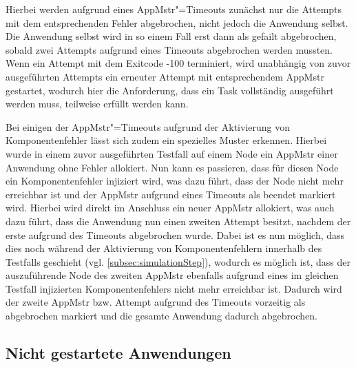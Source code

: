 Hierbei werden aufgrund eines \ac{AppMstr}"=Timeouts zunächst nur die Attempts mit dem entsprechenden Fehler abgebrochen, nicht jedoch die Anwendung selbst.
Die Anwendung selbst wird in so einem Fall erst dann als gefailt abgebrochen, sobald zwei Attempts aufgrund eines Timeouts abgebrochen werden mussten.
Wenn ein Attempt mit dem Exitcode -100 terminiert, wird unabhängig von zuvor ausgeführten Attempts ein erneuter Attempt mit entsprechendem \ac{AppMstr} gestartet, wodurch hier die Anforderung, dass ein Task vollständig ausgeführt werden muss, teilweise erfüllt werden kann.

Bei einigen der \ac{AppMstr}"=Timeouts aufgrund der Aktivierung von Komponentenfehler lässt sich zudem ein spezielles Muster erkennen.
Hierbei wurde in einem zuvor ausgeführten Testfall auf einem Node ein \ac{AppMstr} einer Anwendung ohne Fehler allokiert.
Nun kann es passieren, dass für diesen Node ein Komponentenfehler injiziert wird, was dazu führt, dass der Node nicht mehr erreichbar ist und der \ac{AppMstr} aufgrund eines Timeouts als beendet markiert wird.
Hierbei wird direkt im Anschluss ein neuer \ac{AppMstr} allokiert, was auch dazu führt, dass die Anwendung nun einen zweiten Attempt besitzt, nachdem der erste aufgrund des Timeouts abgebrochen wurde.
Dabei ist es nun möglich, dass dies noch während der Aktivierung von Komponentenfehlern innerhalb des Testfalls geschieht (vgl. \cref{subsec:simulationStep}), wodurch es möglich ist, dass der auszuführende Node des zweiten \ac{AppMstr} ebenfalls aufgrund eines im gleichen Testfall injizierten Komponentenfehlers nicht mehr erreichbar ist.
Dadurch wird der zweite \ac{AppMstr} bzw. Attempt aufgrund des Timeouts vorzeitig als abgebrochen markiert und die gesamte Anwendung dadurch abgebrochen.

\subsection{Nicht gestartete Anwendungen}
\label{subsec:notStartedApps}

